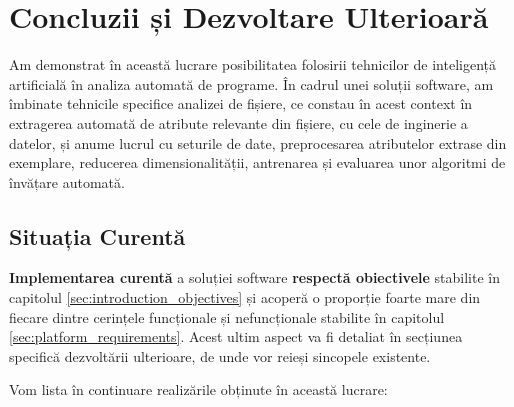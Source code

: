 \documentclass[../../main.tex]{subfiles}
\begin{document}
\chapter{Concluzii și Dezvoltare Ulterioară}
\label{ch:conclusions}

Am demonstrat în această lucrare posibilitatea folosirii tehnicilor de inteligență artificială în analiza automată de programe. În cadrul unei soluții software, am îmbinate tehnicile specifice analizei de fișiere, ce constau în acest context în extragerea automată de atribute relevante din fișiere, cu cele de inginerie a datelor, și anume lucrul cu seturile de date, preprocesarea atributelor extrase din exemplare, reducerea dimensionalității, antrenarea și evaluarea unor algoritmi de învățare automată.

\section{Situația Curentă}
\label{sec:conclusions_status}

\textbf{Implementarea curentă} a soluției software \textbf{respectă obiectivele} stabilite în capitolul \ref{sec:introduction_objectives} și acoperă o proporție foarte mare din fiecare dintre cerințele funcționale și nefuncționale stabilite în capitolul \ref{sec:platform_requirements}. Acest ultim aspect va fi detaliat în secțiunea specifică dezvoltării ulterioare, de unde vor reieși sincopele existente.

Vom lista în continuare realizările obținute în această lucrare:
\end{document}
